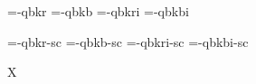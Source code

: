 

\ifx\sizespec\undefined \def\sizespec{}\fi
\ifx\font\corkencoded {}\else {}\fi

\ifx\font\unicoded  {} 
\else

\font\tenrm=\tmp-qbkr  \sizespec
\font\tenbf=\tmp-qbkb  \sizespec
\font\tenit=\tmp-qbkri \sizespec
\font\tenbi=\tmp-qbkbi \sizespec

\font\tenrmc=\tmp-qbkr-sc  \sizespec
\font\tenbfc=\tmp-qbkb-sc  \sizespec
\font\tenitc=\tmp-qbkri-sc \sizespec
\font\tenbic=\tmp-qbkbi-sc \sizespec

\fi

\tenrm

\ifx\regfontdefault\undefined \else
   \regfontdefault
   \regfont\tenrmc \regfont\tenitc
   \regfont\tenbfc \regfont\tenbic
\fi

\def\caps#1{{\escapechar=-1 \expandafter}%
  \expandafter\csname\expandafter\tenonlytext\string#1c\endcsname}
\def\tenonlytext{ten}

\ifx\font\corkencoded\else \ifx\font\unicoded\else  \fi\fi
\ifx\mathpreloaded X\else  \fi                     


